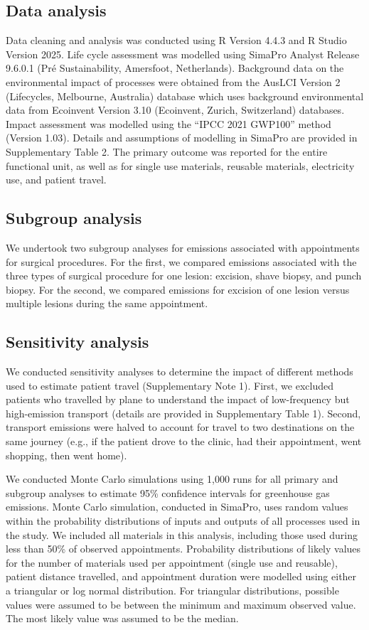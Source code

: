 \begin{refsection}
\subsection{Data analysis}
Data cleaning and analysis was conducted using R Version 4.4.3 and R Studio Version 2025. Life cycle assessment was modelled using SimaPro Analyst Release 9.6.0.1 (Pré Sustainability, Amersfoot, Netherlands). Background data on the environmental impact of processes were obtained from the AusLCI Version 2 (Lifecycles, Melbourne, Australia) database which uses background environmental data from Ecoinvent Version 3.10 (Ecoinvent, Zurich, Switzerland) databases. Impact assessment was modelled using the “IPCC 2021 GWP100” method (Version 1.03). Details and assumptions of modelling in SimaPro are provided in Supplementary Table 2. The primary outcome was reported for the entire functional unit, as well as for single use materials, reusable materials, electricity use, and patient travel.

\subsection{Subgroup analysis}
We undertook two subgroup analyses for emissions associated with appointments for surgical procedures. For the first, we compared emissions associated with the three types of surgical procedure for one lesion: excision, shave biopsy, and punch biopsy. For the second, we compared emissions for excision of one lesion versus multiple lesions during the same appointment. 

\subsection{Sensitivity analysis}
We conducted sensitivity analyses to determine the impact of different methods used to estimate patient travel (Supplementary Note 1). First, we excluded patients who travelled by plane to understand the impact of low-frequency but high-emission transport (details are provided in Supplementary Table 1). Second, transport emissions were halved to account for travel to two destinations on the same journey (e.g., if the patient drove to the clinic, had their appointment, went shopping, then went home). 

We conducted Monte Carlo simulations using 1,000 runs for all primary and subgroup analyses to estimate 95\% confidence intervals for greenhouse gas emissions. Monte Carlo simulation, conducted in SimaPro, uses random values within the probability distributions of inputs and outputs of all processes used in the study. We included all materials in this analysis, including those used during less than 50\% of observed appointments. Probability distributions of likely values for the number of materials used per appointment (single use and reusable), patient distance travelled, and appointment duration were modelled using either a triangular or log normal distribution. For triangular distributions, possible values were assumed to be between the minimum and maximum observed value. The most likely value was assumed to be the median. 


\end{refsection}
